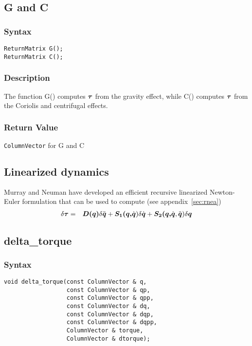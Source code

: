 \documentclass[dvips,11pt,fleqn]{report}
\newcommand{\mbold}[1]{\mbox{\boldmath $ #1 $}}
\begin{document}
\newpage

\subsection*{G and C}
\subsubsection*{Syntax}
\begin{verbatim}
ReturnMatrix G();
ReturnMatrix C();
\end{verbatim}
\subsubsection*{Description}
The function G() computes $\mbold{\tau}$ from the gravity effect,
while C() computes $\mbold{\tau}$ from the Coriolis and centrifugal
effects.

\subsubsection*{Return Value}

{\tt ColumnVector} for G and C

\newpage

\subsection{Linearized dynamics}
Murray and Neuman \cite{Murray86} have developed an efficient recursive linearized Newton-Euler formulation 
that can be used to compute (see appendix~\ref{sec:rnea})
\begin{eqnarray}
\delta \mbold{\tau} & = & \mbold{D(q)} \delta \ddot{\mbold{q}} 
+ \mbold{S_1(q,}\dot{\mbold{q}}) \delta \dot{\mbold{q}}
+ \mbold{S_2(q,}\dot{\mbold{q}},\ddot{\mbold{q}}) \delta \mbold{q}
\end{eqnarray}

\subsection*{delta\_torque}
\subsubsection*{Syntax}
\begin{verbatim}
void delta_torque(const ColumnVector & q, 
                  const ColumnVector & qp,
                  const ColumnVector & qpp, 
                  const ColumnVector & dq,
                  const ColumnVector & dqp, 
                  const ColumnVector & dqpp,
                  ColumnVector & torque, 
                  ColumnVector & dtorque);
\end{verbatim}
\end{document}
